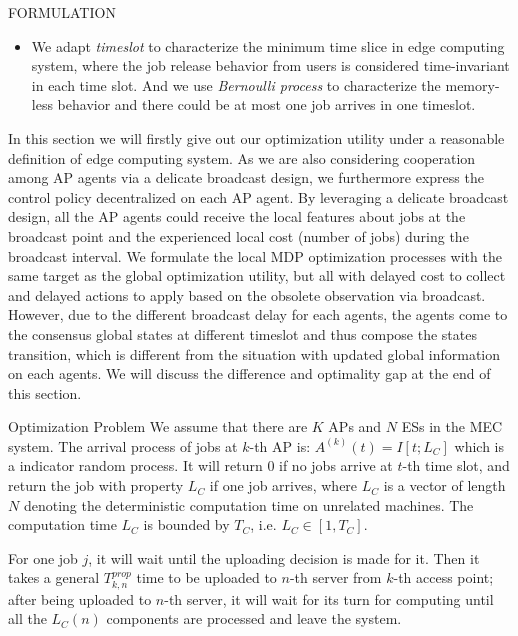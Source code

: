 \documentclass[10pt, conference, letterpaper]{IEEEtran}
\begin{document}
    \begin{section}{FORMULATION}
        \label{sec:formulation}
        \begin{itemize}
            \item We adapt \emph{timeslot} to characterize the minimum time slice in edge computing system, where the job release behavior from users is considered time-invariant in each time slot. And we use \emph{Bernoulli process} to characterize the memory-less behavior and there could be at most one job arrives in one timeslot. 
        \end{itemize}

        In this section we will firstly give out our optimization utility under a reasonable definition of edge computing system. As we are also considering cooperation among AP agents via a delicate broadcast design, we furthermore express the control policy decentralized on each AP agent.
        By leveraging a delicate broadcast design, all the AP agents could receive the local features about jobs at the broadcast point and the experienced local cost (number of jobs) during the broadcast interval.
        We formulate the local MDP optimization processes with the same target as the global optimization utility, but all with delayed cost to collect and delayed actions to apply based on the obsolete observation via broadcast. However, due to the different broadcast delay for each agents, the agents come to the consensus global states at different timeslot and thus compose the states transition, which is different from the situation with updated global information on each agents. We will discuss the difference and optimality gap at the end of this section.

        \begin{subsection}{Optimization Problem}
            We assume that there are $K$ APs and $N$ ESs in the MEC system.
            The arrival process of jobs at $k$-th AP is: $A^{(k)}(t)=I[t; L_C]$ which is a indicator random process. It will return $0$ if no jobs arrive at $t$-th time slot, and return the job with property $L_C$ if one job arrives, where $L_C$ is a vector of length $N$ denoting the deterministic computation time on unrelated machines.
            The computation time $L_C$ is bounded by $T_C$, i.e. $L_C \in [1,T_C]$.
                
            For one job $j$, it will wait until the uploading decision is made for it. Then it takes a general $T^{prop}_{k,n}$ time to be uploaded to $n$-th server from $k$-th access point; after being uploaded to $n$-th server, it will wait for its turn for computing until all the $L_C(n)$ components are processed and leave the system.
                

\end{subsection}
\end{section}
\end{document}

